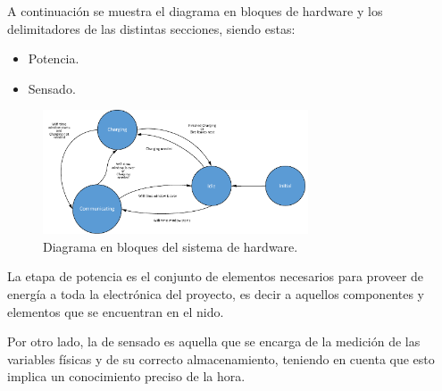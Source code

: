 A continuación se muestra el diagrama en bloques de hardware y los delimitadores de las distintas secciones, siendo estas:
\begin{itemize}
\item Potencia.
\item Sensado.
\end{itemize}

\begin{figure}[H]
	\centering
	\includegraphics[width=0.7\textwidth, page=7]{ImagenesIngenieria de Detalle/FlowChart.pdf}		
	\caption{Diagrama en bloques del sistema de hardware.}
	\label{fig:diagrama_hardware}
\end{figure}

La etapa de potencia es el conjunto de elementos necesarios para proveer de energía a toda la electrónica del proyecto, es decir a aquellos componentes y elementos que se encuentran en el nido.


Por otro lado, la de sensado es aquella que se encarga de la medición de las variables físicas y de su correcto almacenamiento, teniendo en cuenta que esto implica un conocimiento preciso de la hora.
